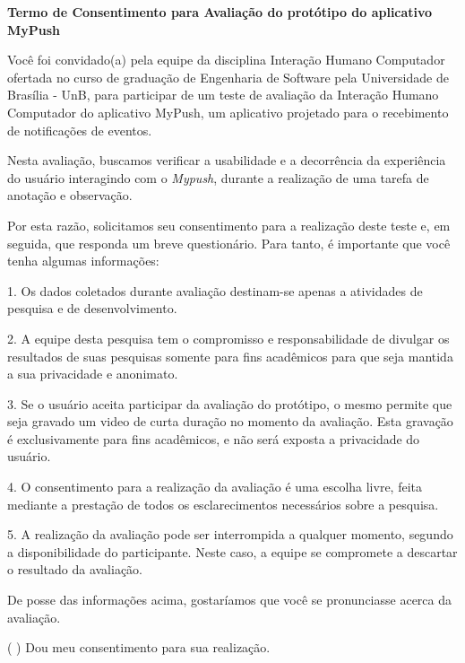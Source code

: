       \begin{center}
      
       \textbf{Termo de Consentimento para Avaliação do protótipo do aplicativo MyPush}
       
      \end{center}
      
      Você foi convidado(a) pela equipe da disciplina Interação Humano Computador ofertada no curso de graduação de Engenharia de Software 
      pela Universidade de Brasília - UnB, para participar de um teste de avaliação da Interação Humano Computador do aplicativo MyPush, 
      um aplicativo projetado para o recebimento de notificações de eventos.
      
      Nesta avaliação, buscamos verificar a usabilidade e a decorrência da experiência do usuário interagindo com o \textit{Mypush}, durante a 
      realização de uma tarefa de anotação e observação.

      Por esta razão, solicitamos seu consentimento para a realização deste teste e, em seguida, que responda um breve questionário. 
      Para tanto, é importante que você tenha algumas informações: 
      
      1. Os dados coletados durante avaliação destinam-se apenas a atividades de pesquisa e de desenvolvimento.
      
      2. A equipe desta pesquisa tem o compromisso e responsabilidade de divulgar os resultados de suas pesquisas somente para fins acadêmicos 
      para que seja mantida a sua privacidade e anonimato. 
      
      3. Se o usuário aceita participar da avaliação do protótipo, o mesmo permite que seja gravado um video de curta duração no momento da avaliação. Esta gravação é exclusivamente para fins acadêmicos, e não será exposta a privacidade do usuário.
      
      4. O consentimento para a realização da avaliação é uma escolha livre, feita mediante a prestação de todos os esclarecimentos necessários 
      sobre a pesquisa.
      
      5. A realização da avaliação pode ser interrompida a qualquer momento, segundo a disponibilidade do participante. Neste caso, a equipe se 
      compromete a descartar o resultado da avaliação.
      
      De posse das informações acima, gostaríamos que você se pronunciasse acerca da avaliação.
      
      ( ) Dou meu consentimento para sua realização. 
      
